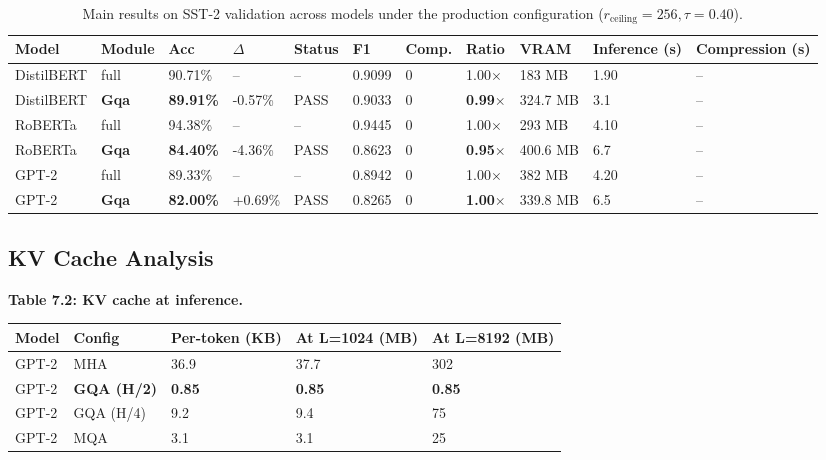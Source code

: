 \begin{table}[t]
\centering
\small
\begin{tabular}{lllllllllll}
\toprule
\textbf{Model} & \textbf{Module} & \textbf{Acc} & \textbf{$\Delta$} & \textbf{Status} & \textbf{F1} & \textbf{Comp.} & \textbf{Ratio} & \textbf{VRAM} & \textbf{Inference (s)} & \textbf{Compression (s)} \\
\midrule
DistilBERT & full & 90.71\% & -- & -- & 0.9099 & 0 & 1.00$\times$ & 183 MB & 1.90 & -- \\
DistilBERT & \textbf{Gqa} & \textbf{89.91\%} & -0.57\% & PASS & 0.9033 & 0 & \textbf{0.99$\times$} & 324.7 MB & 3.1 & -- \\
RoBERTa & full & 94.38\% & -- & -- & 0.9445 & 0 & 1.00$\times$ & 293 MB & 4.10 & -- \\
RoBERTa & \textbf{Gqa} & \textbf{84.40\%} & -4.36\% & PASS & 0.8623 & 0 & \textbf{0.95$\times$} & 400.6 MB & 6.7 & -- \\
GPT-2 & full & 89.33\% & -- & -- & 0.8942 & 0 & 1.00$\times$ & 382 MB & 4.20 & -- \\
GPT-2 & \textbf{Gqa} & \textbf{82.00\%} & +0.69\% & PASS & 0.8265 & 0 & \textbf{1.00$\times$} & 339.8 MB & 6.5 & -- \\
\bottomrule
\end{tabular}
\caption{Main results on SST-2 validation across models under the production configuration ($r_{\mathrm{ceiling}}=256, \tau=0.40$).}
\label{tab:main_sst2}
\end{table}

\subsection{KV Cache Analysis}

\textbf{Table 7.2: KV cache at inference.}

\begin{table}[H]
\centering
\small
\begin{tabular}{lllll}
\toprule
\textbf{Model} & \textbf{Config} & \textbf{Per-token (KB)} & \textbf{At L=1024 (MB)} & \textbf{At L=8192 (MB)} \\
\midrule
GPT-2 & MHA & 36.9 & 37.7 & 302 \\
GPT-2 & \textbf{GQA (H/2)} & \textbf{0.85} & \textbf{0.85} & \textbf{0.85} \\
GPT-2 & GQA (H/4) & 9.2 & 9.4 & 75 \\
GPT-2 & MQA & 3.1 & 3.1 & 25 \\
\bottomrule
\end{tabular}
\end{table}

